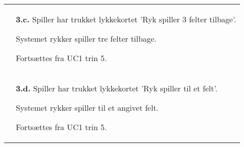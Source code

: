 \documentclass[class=article, crop=false]{standalone}
\begin{document}
\begin{table}[H]
\begin{tabularx}{\textwidth}{|l|X|}
                            & \textbf{3.c.} Spiller har trukket lykkekortet 'Ryk spiller 3 felter tilbage'.
                            \begin{enumerate} \begin{tabenum}
                                                  \item Systemet rykker spiller tre felter tilbage.
                                                  \item Fortsættes fra UC1 trin 5.
                            \end{tabenum} \end{enumerate}
                            \\

                            & \textbf{3.d.} Spiller har trukket lykkekortet 'Ryk spiller til et felt'.
                            \begin{enumerate} \begin{tabenum}
                                                  \item Systemet rykker spiller til et angivet felt.
                                                  \item Fortsættes fra UC1 trin 5.
                            \end{tabenum} \end{enumerate}
                            \\





            \hline

        \end{tabularx}


    \end{table}
\end{document}
